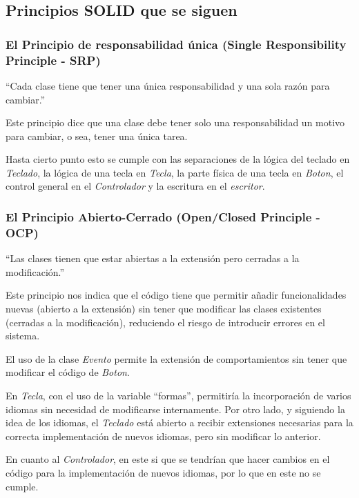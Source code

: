 \subsection{Principios SOLID que se siguen}

\subsubsection{El Principio de responsabilidad única (Single Responsibility Principle - SRP)}

``Cada clase tiene que tener una única responsabilidad y una sola razón para cambiar.''

Este principio dice que una clase debe tener solo una responsabilidad un motivo para cambiar, o sea, tener una única tarea.

Hasta cierto punto esto se cumple con las separaciones de la lógica del teclado en \textit{Teclado}, la lógica de una tecla en \textit{Tecla}, la parte física de una tecla en \textit{Boton}, el control general en el \textit{Controlador} y la escritura en el \textit{escritor}.


\subsubsection{El Principio Abierto-Cerrado (Open/Closed Principle - OCP)}

``Las clases tienen que estar abiertas a la extensión pero cerradas a la modificación.''

Este principio nos indica que el código tiene que permitir añadir funcionalidades nuevas (abierto a la extensión) sin tener que modificar las clases existentes (cerradas a la modificación), reduciendo el riesgo de introducir errores en el sistema.

El uso de la clase \textit{Evento} permite la extensión de comportamientos sin tener que modificar el código de \textit{Boton}.

En \textit{Tecla}, con el uso de la variable ``formas'', permitiría la incorporación de varios idiomas sin necesidad de modificarse internamente. Por otro lado, y siguiendo la idea de los idiomas, el \textit{Teclado} está abierto a recibir extensiones necesarias para la correcta implementación de nuevos idiomas, pero sin modificar lo anterior.

En cuanto al \textit{Controlador}, en este si que se tendrían que hacer cambios en el código para la implementación de nuevos idiomas, por lo que en este no se cumple.

